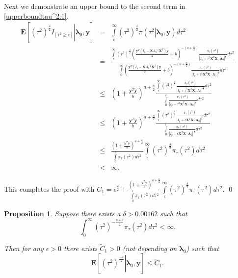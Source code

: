 \documentclass[noinfoline,11pt]{imsart}
\numberwithin{equation}{section}
\theoremstyle{plain}
\newtheorem{prop}{Proposition}[section]
\newcommand{\y}{\mathbf{y}}
\newcommand{\X}{\mathbf{X}}
\newcommand{\bl}{\boldsymbol{\lambda}}
\newcommand{\Bl}{\boldsymbol{\Lambda}}
\newcommand{\E}{\boldsymbol{E}}
\begin{document}
\noindent
Next we demonstrate an upper bound to the second term in \eqref{upperboundtau^2:1}.
\begin{eqnarray}
 \E\left[\left.\left(\tau^2\right)^{\frac{\delta}{2}}I_{\left[\tau^2\geq\epsilon\right]}\right| \bl_0,\y\right]&=&\int\limits_{\epsilon}^\infty\left(\tau^2\right)^{\frac{\delta}{2}}\pi\left(\left.\tau^2\right|\bl_0,\y\right)d\tau^2\nonumber \\
 &=& \frac{\int\limits_{\epsilon}^\infty\left(\tau^2\right)^{\frac{\delta}{2}}\left(\frac{\y^T\left(I_n-\X A_0^{-1}\X^T\right)\y}{2}+b\right)^{-\left(a+\frac{n}{2}\right)}\frac{\pi_\tau\left(\tau^2\right)}{\left|I_p+\tau^2\X^T\X\cdot\Bl_0\right|^{\frac{1}{2}}}d\tau^2}{\int\limits_{0}^\infty\left(\frac{\y^T\left(I_n-\X A_0^{-1}\X^T\right)\y}{2}+b\right)^{-\left(a+\frac{n}{2}\right)}\frac{\pi_\tau\left(\tau^2\right)}{\left|I_p+\tau^2\X^T\X\cdot\Bl_0\right|^{\frac{1}{2}}}d\tau^2}\nonumber \\
 &\leq& \left(1+\frac{\y^T\y}{b}\right)^{a+\frac{n}{2}}\frac{\int\limits_{\epsilon}^\infty\left(\tau^2\right)^{\frac{\delta}{2}}\frac{\pi_\tau\left(\tau^2\right)}{\left|I_p+\tau^2\X^T\X\cdot\Bl_0\right|^{\frac{1}{2}}}d\tau^2}{\int\limits_{0}^\epsilon\frac{\pi_\tau\left(\tau^2\right)}{\left|I_p+\tau^2\X^T\X\cdot\Bl_0\right|^{\frac{1}{2}}}d\tau^2}\nonumber \\
 &\leq& \left(1+\frac{\y^T\y}{b}\right)^{a+\frac{n}{2}}\frac{\int\limits_{\epsilon}^\infty\left(\tau^2\right)^{\frac{\delta}{2}}\frac{\pi_\tau\left(\tau^2\right)}{\left|I_p+\epsilon\X^T\X\cdot\Bl_0\right|^{\frac{1}{2}}}d\tau^2}{\int\limits_0^\epsilon\frac{\pi_\tau\left(\tau^2\right)}{\left|I_p+\epsilon\X^T\X\cdot\Bl_0\right|^{\frac{1}{2}}}d\tau^2}\nonumber \\
 &\leq&\frac{\left(1+\frac{\y^T\y}{b}\right)^{a+\frac{n}{2}}}{\int\limits_0^\epsilon\pi_\tau\left(\tau^2\right)d\tau^2}\int\limits_\epsilon^\infty\left(\tau^2\right)^{\frac{\delta}{2}}\pi_\tau\left(\tau^2\right)d\tau^2\nonumber \\
 &<& \infty. 
\end{eqnarray}

\noindent
This completes the proof with $C_1=\epsilon^{\frac{\delta}{2}}+\frac{\left(1+\frac{\y^T\y}{b}\right)^{a+\frac{n}{2}}}{\int\limits_{0}^\epsilon\pi_\tau\left(\tau^2\right)d\tau^2}\int\limits_{\epsilon}^\infty\left(\tau^2\right)^{\frac{\delta}{2}}\pi_\tau\left(\tau^2\right)d\tau^2$. \qed 

\begin{prop}\label{upperboundontau^2:negative:moment}
Suppose there exists a $\delta > 0.00162$ such that 
$$
\int_0^\infty (\tau^2)^{-\frac{p+\delta}{2}} \pi_\tau (\tau^2) d \tau^2 < 
\infty. 
$$

\noindent
Then for any $\epsilon>0$ there exists $\tilde{C}_1>0$ (not depending on $\bl_0$) 
such that  
$$
\E\left[\left.\left(\tau^2\right)^{\frac{-\delta}{2}}\right|\bl_0,\y\right] \leq \tilde{C}_1. 
$$
\end{prop}
\end{document}
